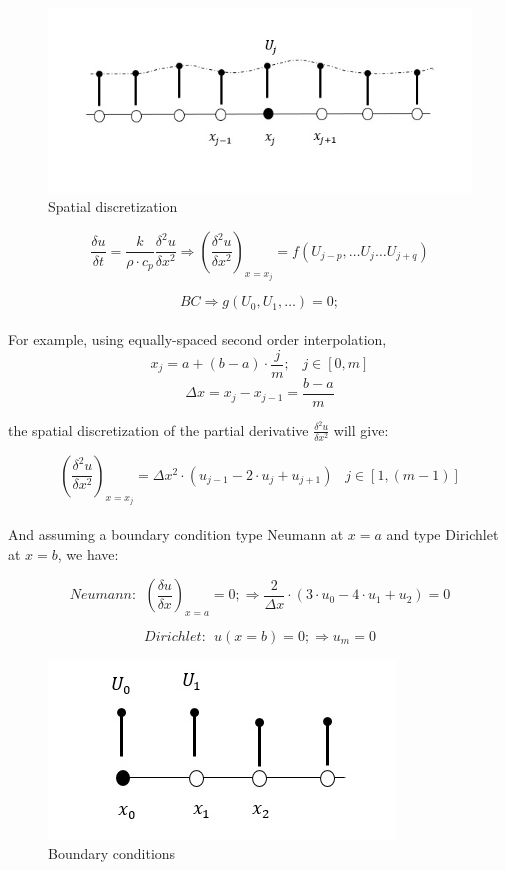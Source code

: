 \begin{figure}[h]
\centering
\includegraphics[scale=0.7, trim = 30mm 15mm 25mm 0mm,
clip]{./Figures/2-CauchyProblem/spatial_discretization.jpg}
\caption{Spatial discretization}
\end{figure}

$$
\frac{\delta u}{\delta t}= \frac{k}{\rho \cdot c_p } \frac{\delta^2 u}{\delta
x^2} \Longrightarrow \left(\frac{\delta^2 u}{\delta
x^2}\right)_{x=x_j} = f(U_{j-p},\ldots U_j \ldots U_{j+q})$$

$$
BC \Longrightarrow g(U_0,U_1,\ldots)=0;$$\\

For example, using equally-spaced second order interpolation, 
$$
x_j= a+(b-a) \cdot \frac{j}{m}; \;\;\; j\in [0,m]
$$
$$
\Delta x= x_j-x_{j-1}= \frac{b-a}{m}
$$

the spatial
discretization of the partial derivative $\frac{\delta^2 u}{\delta
x^2}$ will give: 

$$
\left(\frac{\delta^2 u}{\delta
x^2}\right)_{x=x_j} ={\Delta x^2} \cdot ( u_{j-1}
-2 \cdot u_{j} +u_{j+1}) \;\;\; j\in[1,(m-1)]$$\\

And assuming a boundary condition type Neumann at $x=a$ and type Dirichlet at
$x=b$, we have: 

$$
Neumann: \:\: \left(\frac{\delta u}{\delta
x}\right)_{x=a} =0; \Longrightarrow \frac{2}{\Delta
x}\cdot (3 \cdot u_0 -4 \cdot u_{1} + u_{2}) =0$$


$$
Dirichlet: \:\: u(x=b)=0; \Longrightarrow u_m=0
$$

\begin{figure}[h]
\centering
\includegraphics[scale=0.7, trim = 10mm 0mm 15mm 0mm,
clip]{./Figures/2-CauchyProblem/BC.jpg}
\caption{Boundary conditions}
\end{figure}

